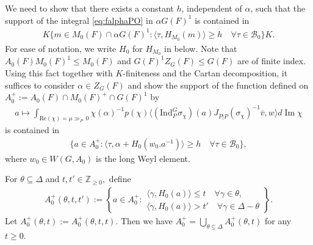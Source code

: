 \documentclass[10pt]{amsart}
\theoremstyle{definition}
\numberwithin{equation}{section}
\numberwithin{equation}{subsection}
\newcommand{\Ind}{\mathrm{Ind}}
\newcommand{\ZZ}{\mathbb{Z}}
\newcommand{\RR}{\mathbb{R}}
\newcommand{\calB}{\mathcal{B}}
\renewcommand{\Im}{\mathop{\mathrm{Im}}}
\begin{document}

 We need to show that there exists a constant $h$, independent of $\alpha$, such that the support of the integral \eqref{eq:falphaPO} in  $\alpha G(F)^1$ is contained in
\begin{align*}
    K \{m\in M_0(F)\cap \alpha G (F)^1: \langle \tau,H_{M_0}(m)\rangle\ge h\quad  \forall \tau\in \calB_0 \}K.
\end{align*}
For ease of notation, we write $H_0$ for $H_{M_0}$ in below. Note that $A_0(F)M_0(F)^1\le M_0(F)$ and $G(F)^1Z_G(F)\le G(F)$ are of finite index. Using this fact together with $K$-finiteness and the Cartan decomposition, it suffices to consider $\alpha\in Z_G(F)$ and show the support of the function defined on $A_0^+:=A_0(F)\cap M_0(F)^+\cap G(F)^1$ by 
\begin{align}\label{eq:cptsupport1}
    a\mapsto \int_{\mathrm{{Re}}(\chi)= \mu\gg_P \, 0} \chi(\alpha)^{-1}p(\chi)\langle (\Ind_P^G\sigma_\chi)(a)J_{\overline{P}|P}(\sigma_\chi)^{-1}\bar{v},w\rangle d\Im\chi
\end{align}
is contained in 
 \begin{align}\label{eq:criterion}
     \{a\in A_0^+: \langle \tau,\alpha +H_0(w_0.a^{-1})\rangle\ge h\quad  \forall \tau\in \calB_0 \},
 \end{align}
where $w_0\in W(G,A_0)$ is the long Weyl element.

For $\theta\subseteq \Delta$ and $t,t'\in \ZZ_{\ge 0},$ define
\begin{align*}
    A_0^+(\theta,t,t'):=\left\{ a\in A_0^+: \substack{\langle \gamma,H_0(a)\rangle\le t \quad\forall\gamma\in\theta,\quad\\ \langle \gamma,H_0(a)\rangle >t'\quad\forall\gamma\in \Delta-\theta}\right\}.
\end{align*}
Let $A_0^+(\theta,t):=A_0^+(\theta,t,t).$ Then we have $A_0^+=\bigcup\limits_{\theta\subseteq\Delta}A_0^+(\theta,t)$ for any $t\ge 0$. 
\end{document}
